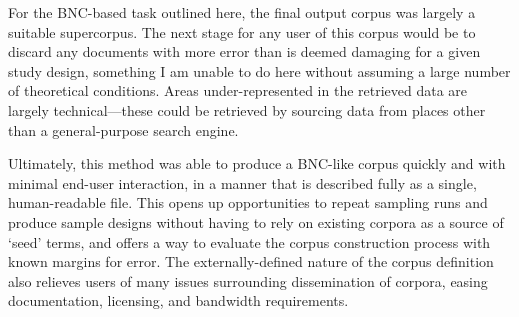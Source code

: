 For the BNC-based task outlined here, the final output corpus was largely a suitable supercorpus.  The next stage for any user of this corpus would be to discard any documents with more error than is deemed damaging for a given study design, something I am unable to do here without assuming a large number of theoretical conditions.  Areas under-represented in the retrieved data are largely technical---these could be retrieved by sourcing data from places other than a general-purpose search engine.  %

Ultimately, this method was able to produce a BNC-like corpus quickly and with minimal end-user interaction, in a manner that is described fully as a single, human-readable file.  This opens up opportunities to repeat sampling runs and produce sample designs without having to rely on existing corpora as a source of `seed' terms, and offers a way to evaluate the corpus construction process with known margins for error.  The externally-defined nature of the corpus definition also relieves users of many issues surrounding dissemination of corpora, easing documentation, licensing, and bandwidth requirements.







